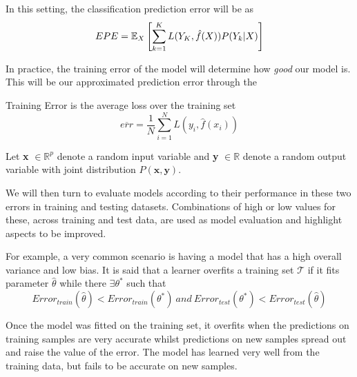 
In this setting, the classification prediction error will be as
\begin{equation}\label{classificationEPE}
EPE = \operatorname{\mathbb{E}}_X\left[ \sum_{k=1}^{K} L( Y_K , \hat{f}(X) ) P(Y_k|X) \right]
\end{equation}


In practice, the training error of the model will determine how \textit{good} our model is. This will be our approximated prediction error through the
\begin{definition}{Training Error}
is the average loss over the training set
$$ \overline{err} = \frac{1}{N} \sum_{i=1}^N L(y_i, \hat{f}(x_i) )$$
\end{definition}


Let \textbf{x} $\in \mathbb{R}^{p}$ denote a random input variable and \textbf{y}  $\in \mathbb{R}$ denote a random output variable with joint distribution $P\left(\textbf{x},\textbf{y}\right)$.


We will then turn to evaluate models according to their performance in these two errors in training and testing datasets. Combinations of high or low values for these, across training and test data, are used as model evaluation and highlight aspects to be improved.

For example, a very common scenario is having a model that has a high overall variance and low bias.
It is said that a learner overfits a training set $\mathcal{T}$ if it fits parameter $\hat{\theta}$ while there $\exists \theta^*$ such that
\begin{equation} \label{eq:overfitting}
Error_{train}(\hat{\theta}) < Error_{train}(\theta^*) \  and \ Error_{test}(\theta^*) < Error_{test}(\hat{\theta})
\end{equation}

Once the model was fitted on the training set, it overfits when the predictions on training samples are very accurate whilst predictions on new samples spread out and raise the value of the error. The model has learned very well from the training data, but fails to be accurate on new samples.

